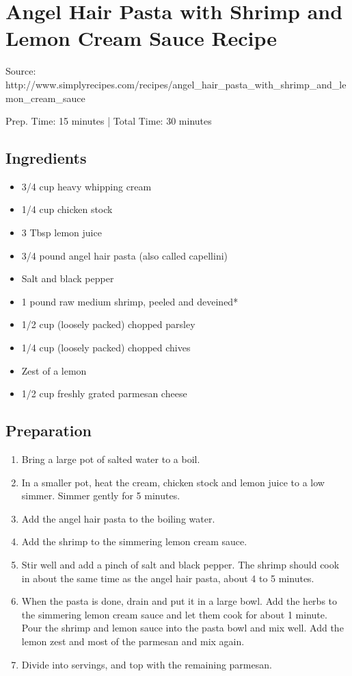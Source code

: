 \section{Angel Hair Pasta with Shrimp and Lemon Cream Sauce Recipe}

Source: http://www.simplyrecipes.com/recipes/angel\_hair\_pasta\_with\_shrimp\_and\_lemon\_cream\_sauce

\begin{center}
Prep. Time: 15 minutes |
Total Time: 30 minutes
\end{center}

\subsection{Ingredients}
\begin{itemize}
    \item 3/4 cup heavy whipping cream
    \item 1/4 cup chicken stock
    \item 3 Tbsp lemon juice
    \item 3/4 pound angel hair pasta (also called capellini)
    \item Salt and black pepper
    \item 1 pound raw medium shrimp, peeled and deveined*
    \item 1/2 cup (loosely packed) chopped parsley
    \item 1/4 cup (loosely packed) chopped chives
    \item Zest of a lemon
    \item 1/2 cup freshly grated parmesan cheese
\end{itemize}

\subsection{Preparation}
\begin{enumerate}
    \item Bring a large pot of salted water to a boil.
    \item In a smaller pot, heat the cream, chicken stock and lemon juice to a low simmer. Simmer gently for 5 minutes.
    \item Add the angel hair pasta to the boiling water.
    \item Add the shrimp to the simmering lemon cream sauce. 
    \item Stir well and add a pinch of salt and black pepper. The shrimp should cook in about the same time as the angel hair pasta, about 4 to 5 minutes.
    \item When the pasta is done, drain and put it in a large bowl. Add the herbs to the simmering lemon cream sauce and let them cook for about 1 minute. Pour the shrimp and lemon sauce into the pasta bowl and mix well. Add the lemon zest and most of the parmesan and mix again.
    \item Divide into servings, and top with the remaining parmesan.
\end{enumerate}

